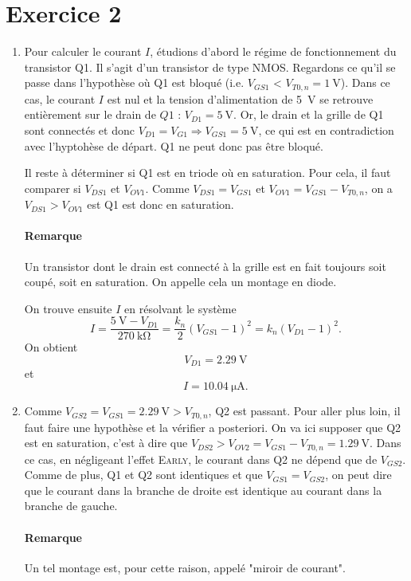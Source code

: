 \section{Exercice 2}
\begin{enumerate}
	\item Pour calculer le courant $I$, étudions d'abord le régime de fonctionnement
	du transistor Q1. Il s'agit d'un transistor de type NMOS. Regardons ce qu'il se
	passe dans l'hypothèse où Q1 est bloqué (i.e. $V_{GS1}$ < $V_{T0,n} = \SI{1}{\volt}$).
	Dans ce cas, le courant $I$ est nul et la tension d'alimentation de \SI{5}{\volt} se
	retrouve entièrement sur le drain de $Q1$ : $V_{D1} = \SI{5}{\volt}$. Or, le drain
	et la grille de Q1 sont connectés et donc $V_{D1} = V_{G1} \Rightarrow V_{GS1}
	= \SI{5}{\volt}$, ce qui est en contradiction avec l'hyptohèse de départ. Q1 ne peut
	donc pas être bloqué.
	
	Il reste à déterminer si Q1 est en triode où en saturation. Pour cela, il faut
	comparer si $V_{DS1}$ et $V_{OV1}$. Comme $V_{DS1} = V_{GS1}$ et $V_{OV1} = V_{GS1} -
	V_{T0,n}$, on a $V_{DS1} > V_{OV1}$ est Q1 est donc en saturation.
	\paragraph*{Remarque} Un transistor dont le drain est connecté à la grille est en
	fait toujours soit coupé, soit en saturation. On appelle cela un montage en diode.
	
	On trouve ensuite $I$ en résolvant le système	
	\[ I = \frac{\SI{5}{\volt}-V_{D1}}{\SI{270}{\kilo\ohm}} = \frac{k_n}{2}(V_{GS1} - 1)^2 =
	k_n(V_{D1} - 1)^2.\]	
	On obtient
	\[ V_{D1} = \SI{2.29}{\volt} \]
	et
	\[ I = \SI{10.04}{\micro\ampere}. \]
	
	\item Comme $V_{GS2}  = V_{GS1} = \SI{2.29}{\volt} > V_{T0,n}$, Q2 est passant. Pour aller
	plus loin, il faut faire une hypothèse et la vérifier a posteriori. On va ici supposer
	que Q2 est en saturation, c'est à dire que $V_{DS2} > V_{OV2} = V_{GS1} - V_{T0,n} =
	\SI{1.29}{\volt}$. Dans ce cas, en négligeant l'effet \textsc{Early}, le courant dans Q2
	ne dépend que de $V_{GS2}$. Comme de plus, Q1 et Q2 sont identiques et que $V_{GS1} = V_{GS2}$,
	on peut dire que le courant dans la branche de droite est identique au courant dans la branche
	de gauche.
	\paragraph{Remarque} Un tel montage est, pour cette raison, appelé "miroir de courant".
	

\end{enumerate}
